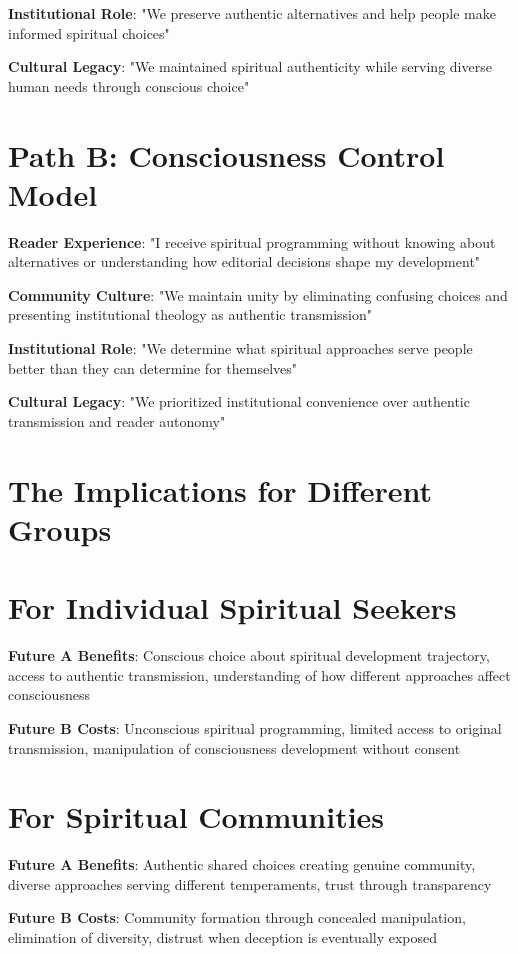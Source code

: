 \documentclass[11pt,twoside]{book}
\begin{document}
\textbf{\textbf{Institutional Role}}: "We preserve authentic alternatives and help people make informed spiritual choices"

\textbf{\textbf{Cultural Legacy}}: "We maintained spiritual authenticity while serving diverse human needs through conscious choice"
\section*{Path B: Consciousness Control Model}
\label{sec:org826a8c8}
\textbf{\textbf{Reader Experience}}: "I receive spiritual programming without knowing about alternatives or understanding how editorial decisions shape my development"

\textbf{\textbf{Community Culture}}: "We maintain unity by eliminating confusing choices and presenting institutional theology as authentic transmission"

\textbf{\textbf{Institutional Role}}: "We determine what spiritual approaches serve people better than they can determine for themselves"

\textbf{\textbf{Cultural Legacy}}: "We prioritized institutional convenience over authentic transmission and reader autonomy"
\section*{The Implications for Different Groups}
\label{sec:org5a6df4d}

\section*{For Individual Spiritual Seekers}
\label{sec:org1d425ea}
\textbf{\textbf{Future A Benefits}}: Conscious choice about spiritual development trajectory, access to authentic transmission, understanding of how different approaches affect consciousness

\textbf{\textbf{Future B Costs}}: Unconscious spiritual programming, limited access to original transmission, manipulation of consciousness development without consent
\section*{For Spiritual Communities}
\label{sec:orgfe95cc4}
\textbf{\textbf{Future A Benefits}}: Authentic shared choices creating genuine community, diverse approaches serving different temperaments, trust through transparency

\textbf{\textbf{Future B Costs}}: Community formation through concealed manipulation, elimination of diversity, distrust when deception is eventually exposed
\end{document}

